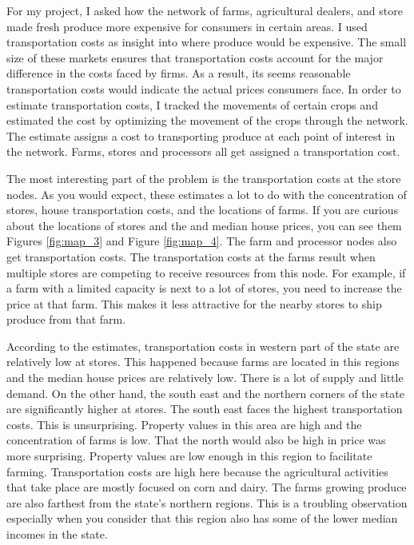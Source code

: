 \documentclass{report}
\begin{document}
For my project, I asked how the network of farms, agricultural dealers, and store made fresh produce more expensive for consumers in certain areas. I used transportation costs as insight into where produce would be expensive. The small size of these markets ensures that transportation costs account for the major difference in the costs faced by firms. As a result, its seems reasonable transportation costs would indicate the actual prices consumers face. In order to estimate transportation costs, I tracked the movements of certain crops and estimated the cost by optimizing the movement of the crops through the network. The estimate assigns a cost to transporting produce at each point of interest in the network. Farms, stores and processors all get assigned a transportation cost.

The most interesting part of the problem is the transportation costs at the store nodes. As you would expect, these estimates a lot to do with the concentration of stores, house transportation costs, and the locations of farms. If you are curious about the locations of stores and the and median house prices, you can see them Figures \ref{fig:map_3} and Figure \ref{fig:map_4}. The farm and processor nodes also get transportation costs. The transportation costs at the farms result when multiple stores are competing to receive resources from this node. For example, if a farm with a limited capacity is next to a lot of stores, you need to increase the price at that farm. This makes it less attractive for the nearby stores to ship produce from that farm.

According to the estimates, transportation costs in western part of the state are relatively low at stores. This happened because farms are located in this regions and the median house prices are relatively low. There is a lot of supply and little demand.  On the other hand, the south east and the northern corners of the state are significantly higher at stores. The south east faces the highest transportation costs. This is unsurprising. Property values in this area are high and the concentration of farms is low. That the north would also be high in price was more surprising. Property values are low enough in this region to facilitate farming. Transportation costs are high here because the agricultural activities that take place are mostly focused on corn and dairy. The farms growing produce are also farthest from the state's northern regions. This is a troubling observation especially when you consider that this region also has some of the lower median incomes in the state. 
\end{document}

